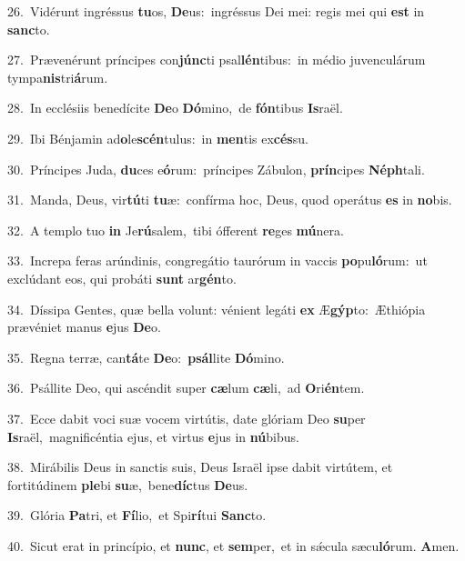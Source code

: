 {\numbfont\textcolor{\numbcolor}{26.}}~Vidérunt ingréssus \textbf{tu}\-os, \textbf{De}\-us:~\star ingréssus Dei mei: regis mei qui \textbf{est} in \textbf{sanc}\-to.\par
{\numbfont\textcolor{\numbcolor}{27.}}~Prævenérunt príncipes con\-\textbf{júnc}\-ti psal\-\textbf{lén}\-tibus:~\star in médio juvenculárum tympa\-\textbf{nis}\-tri\-\textbf{á}\-rum.\par
{\numbfont\textcolor{\numbcolor}{28.}}~In ecclésiis benedícite \textbf{De}\-o \textbf{Dó}\-mino,~\star de \textbf{fón}\-tibus \textbf{Is}\-raël.\par
{\numbfont\textcolor{\numbcolor}{29.}}~Ibi Bénjamin ad\-\textbf{o}\-le\-\textbf{scén}\-tulus:~\star in \textbf{men}\-tis ex\-\textbf{cés}\-su.\par
{\numbfont\textcolor{\numbcolor}{30.}}~Príncipes Juda, \textbf{du}\-ces e\-\textbf{ó}\-rum:~\star príncipes Zábulon, \textbf{prín}\-cipes \textbf{Néph}\-tali.\par
{\numbfont\textcolor{\numbcolor}{31.}}~Manda, Deus, vir\-\textbf{tú}\-ti \textbf{tu}\-æ:~\star confírma hoc, Deus, quod operátus \textbf{es} in \textbf{no}\-bis.\par
{\numbfont\textcolor{\numbcolor}{32.}}~A templo tuo \textbf{in} Je\-\textbf{rú}\-salem,~\star tibi ófferent \textbf{re}\-ges \textbf{mú}\-nera.\par
{\numbfont\textcolor{\numbcolor}{33.}}~Increpa feras arúndinis, congregátio taurórum in vaccis \textbf{po}\-pu\-\textbf{ló}\-rum:~\star ut exclúdant eos, qui probáti \textbf{sunt} ar\-\textbf{gén}\-to.\par
{\numbfont\textcolor{\numbcolor}{34.}}~Díssipa Gentes, quæ bella volunt: vénient legáti \textbf{ex} Æ\-\textbf{gýp}\-to:~\star Æthiópia prævéniet manus \textbf{e}\-jus \textbf{De}\-o.\par
{\numbfont\textcolor{\numbcolor}{35.}}~Regna terræ, can\-\textbf{tá}\-te \textbf{De}\-o:~\star \textbf{psál}\-lite \textbf{Dó}\-mino.\par
{\numbfont\textcolor{\numbcolor}{36.}}~Psállite Deo, qui ascéndit super \textbf{cæ}\-lum \textbf{cæ}\-li,~\star ad \textbf{O}\-ri\-\textbf{én}\-tem.\par
{\numbfont\textcolor{\numbcolor}{37.}}~Ecce dabit voci suæ vocem virtútis, date glóriam Deo \textbf{su}\-per \textbf{Is}\-raël,~\star magnificéntia ejus, et virtus \textbf{e}\-jus in \textbf{nú}\-bibus.\par
{\numbfont\textcolor{\numbcolor}{38.}}~Mirábilis Deus in sanctis suis, Deus Israël ipse dabit virtútem, et fortitúdinem \textbf{ple}\-bi \textbf{su}\-æ,~\star bene\-\textbf{díc}\-tus \textbf{De}\-us.\par
{\numbfont\textcolor{\numbcolor}{39.}}~Glória \textbf{Pa}\-tri, et \textbf{Fí}\-lio,~\star et Spi\-\textbf{rí}\-tui \textbf{Sanc}\-to.\par
{\numbfont\textcolor{\numbcolor}{40.}}~Sicut erat in princípio, et \textbf{nunc}\-, et \textbf{sem}\-per,~\star et in sǽcula sæcu\-\textbf{ló}\-rum. \textbf{A}\-men.\par
